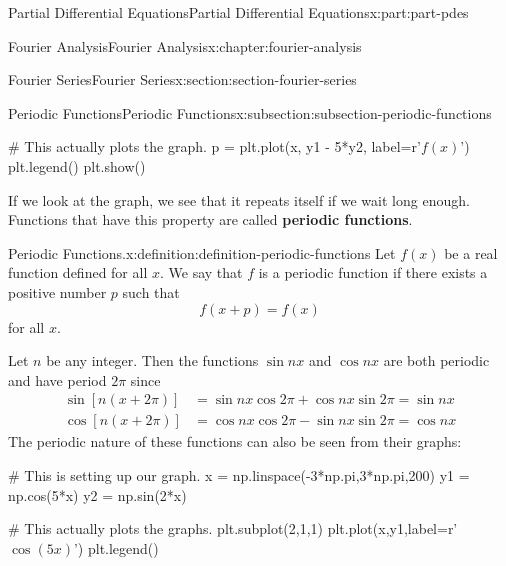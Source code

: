 \documentclass[oneside,10pt,]{book}
\newcommand{\terminology}[1]{\textbf{#1}}
\numberwithin{equation}{part}
\newcommand{\amp}{&}
\begin{document}
\begin{partptx}{Partial Differential Equations}{}{Partial Differential Equations}{}{}{x:part:part-pdes}
\begin{chapterptx}{Fourier Analysis}{}{Fourier Analysis}{}{}{x:chapter:fourier-analysis}
\begin{sectionptx}{Fourier Series}{}{Fourier Series}{}{}{x:section:section-fourier-series}
\begin{subsectionptx}{Periodic Functions}{}{Periodic Functions}{}{}{x:subsection:subsection-periodic-functions}
\begin{sageinput}
# This actually plots the graph.
p = plt.plot(x, y1 - 5*y2, label=r'$f(x)$')
plt.legend()
plt.show()
\end{sageinput}
If we look at the graph, we see that it repeats itself if we wait long enough. Functions that have this property are called \terminology{periodic functions}.%
\begin{definition}{Periodic Functions.}{x:definition:definition-periodic-functions}%
%
Let \(f(x)\) be a real function defined for all \(x\). We say that \(f\) is a periodic function if there exists a positive number \(p\) such that%
\begin{equation*}
f(x+p) = f(x)
\end{equation*}
for all \(x\).%
\end{definition}
 Let \(n\) be any integer. Then the functions \(\sin nx\) and \(\cos nx\) are both periodic and have period \(2\pi\) since%
\begin{align*}
\sin[n(x+2\pi)] \amp = \sin nx\cos2\pi + \cos nx\sin2\pi = \sin nx \\
\cos[n(x+2\pi)] \amp = \cos nx\cos2\pi - \sin nx\sin2\pi = \cos nx 
\end{align*}
The periodic nature of these functions can also be seen from their graphs:%
 \begin{sageinput}
# This is setting up our graph.
x = np.linspace(-3*np.pi,3*np.pi,200)
y1 = np.cos(5*x)
y2 = np.sin(2*x)

# This actually plots the graphs.
plt.subplot(2,1,1)
plt.plot(x,y1,label=r'$\cos(5x)$')
plt.legend()


\end{sageinput}
\end{subsectionptx}
\end{sectionptx}
\end{chapterptx}
\end{partptx}
\end{document}
